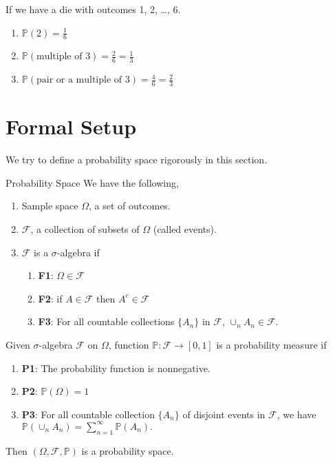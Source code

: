 \begin{example}
If we have a die with outcomes 1, 2, \ldots, 6. 
\begin{enumerate}
    \item $\mathbb{P}(2) = \frac{1}{6}$
    \item $\mathbb{P}(\text{multiple of }3) = \frac{2}{6} = \frac{1}{3}$
    \item \(\mathbb{P}(\text{pair or a multiple of }3) = \frac{4}{6} = \frac{2}{3}\) 
\end{enumerate}
\end{example}
\section{Formal Setup}
We try to define a probability space rigorously in this section.
\begin{definition}{Probability Space}{}
    \label{prospace}
    We have the following,
    \begin{enumerate}
        \item Sample space \(\Omega\), a set of outcomes.
        \item \(\mathcal{F}\), a collection of subsets of \(\Omega\) (called events).
        \item \(\mathcal{F}\) is a \(\sigma\)-algebra if
        \begin{enumerate}
            \item \textbf{F1}: \(\Omega\in\mathcal{F} \)
            \item \textbf{F2}: if \(A \in \mathcal{F} \) then \(A^c \in \mathcal{F} \)
            \item \textbf{F3}: For all countable collections \(\{A_n\}\) in \(\mathcal{F} \), \(\cup_n A_n \in \mathcal{F} \).
        \end{enumerate} 
    \end{enumerate}
    Given \(\sigma\)-algebra \(\mathcal{F}\) on \(\Omega\), function $\mathbb{P}: \mathcal{F} \to [0,1]$ is a probability measure if
    \begin{enumerate}
        \item \textbf{P1}: The probability function is nonnegative.
        \item \textbf{P2}: \(\mathbb{P}(\Omega) = 1\) 
        \item \textbf{P3}: For all countable collection \(\{A_n\}\) of disjoint events in \(\mathcal{F} \), we have
        \(
            \mathbb{P}(\cup_n A_n) = \sum\limits_{n=1}^{\infty} \mathbb{P}(A_n).
        \)
    \end{enumerate}
    Then \((\Omega, \mathcal{F}, \mathbb{P})\) is a probability space. 
\end{definition}


